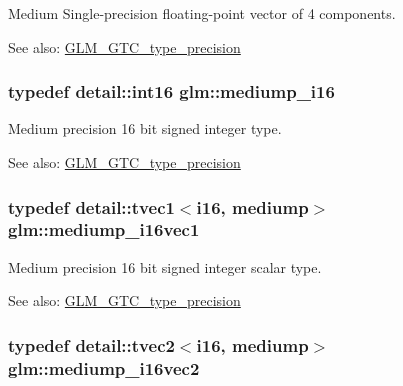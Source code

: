 Medium Single-precision floating-point vector of 4 components. \begin{Desc}
\item[See also:]\hyperlink{group__gtc__type__precision}{GLM\_\-GTC\_\-type\_\-precision} \end{Desc}
\hypertarget{group__gtc__type__precision_g8454fc6a82c7bb787d0ac9663e08f63d}{
\subsubsection[mediump\_\-i16]{\setlength{\rightskip}{0pt plus 5cm}typedef detail::int16 {\bf glm::mediump\_\-i16}}}
\label{group__gtc__type__precision_g8454fc6a82c7bb787d0ac9663e08f63d}


Medium precision 16 bit signed integer type. \begin{Desc}
\item[See also:]\hyperlink{group__gtc__type__precision}{GLM\_\-GTC\_\-type\_\-precision} \end{Desc}
\hypertarget{group__gtc__type__precision_g6a1d37139ea8990de24edf4bfa3500ad}{
\subsubsection[mediump\_\-i16vec1]{\setlength{\rightskip}{0pt plus 5cm}typedef detail::tvec1$<$i16, mediump$>$ {\bf glm::mediump\_\-i16vec1}}}
\label{group__gtc__type__precision_g6a1d37139ea8990de24edf4bfa3500ad}


Medium precision 16 bit signed integer scalar type. \begin{Desc}
\item[See also:]\hyperlink{group__gtc__type__precision}{GLM\_\-GTC\_\-type\_\-precision} \end{Desc}
\hypertarget{group__gtc__type__precision_g664a0266910df3c2d6559651f94d32e6}{
\subsubsection[mediump\_\-i16vec2]{\setlength{\rightskip}{0pt plus 5cm}typedef detail::tvec2$<$i16, mediump$>$ {\bf glm::mediump\_\-i16vec2}}}
\label{group__gtc__type__precision_g664a0266910df3c2d6559651f94d32e6}



